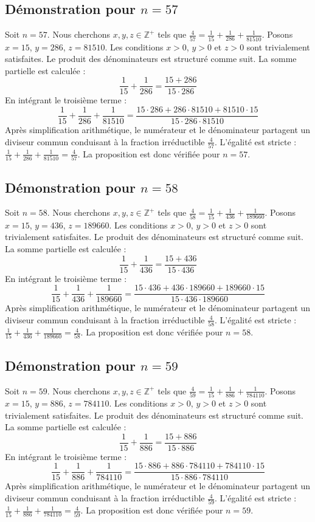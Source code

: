 \documentclass[11pt,a4paper]{article}
\begin{document}
\subsection{Démonstration pour $n = 57$}
Soit $n = 57$. Nous cherchons $x, y, z \in \mathbb{Z}^{+}$ tels que $\frac{4}{57} = \frac{1}{15} + \frac{1}{286} + \frac{1}{81510}$.
Posons $x = 15$, $y = 286$, $z = 81510$.
Les conditions $x > 0$, $y > 0$ et $z > 0$ sont trivialement satisfaites.
Le produit des dénominateurs est structuré comme suit. La somme partielle est calculée :
$$ \frac{1}{15} + \frac{1}{286} = \frac{15+286}{15 \cdot 286} $$
En intégrant le troisième terme :
$$ \frac{1}{15} + \frac{1}{286} + \frac{1}{81510} = \frac{15 \cdot 286 + 286 \cdot 81510 + 81510 \cdot 15}{15 \cdot 286 \cdot 81510} $$
Après simplification arithmétique, le numérateur et le dénominateur partagent un diviseur commun conduisant à la fraction irréductible $\frac{4}{57}$.
L'égalité est stricte : $\frac{1}{15} + \frac{1}{286} + \frac{1}{81510} = \frac{4}{57}$.
La proposition est donc vérifiée pour $n = 57$.
\subsection{Démonstration pour $n = 58$}
Soit $n = 58$. Nous cherchons $x, y, z \in \mathbb{Z}^{+}$ tels que $\frac{4}{58} = \frac{1}{15} + \frac{1}{436} + \frac{1}{189660}$.
Posons $x = 15$, $y = 436$, $z = 189660$.
Les conditions $x > 0$, $y > 0$ et $z > 0$ sont trivialement satisfaites.
Le produit des dénominateurs est structuré comme suit. La somme partielle est calculée :
$$ \frac{1}{15} + \frac{1}{436} = \frac{15+436}{15 \cdot 436} $$
En intégrant le troisième terme :
$$ \frac{1}{15} + \frac{1}{436} + \frac{1}{189660} = \frac{15 \cdot 436 + 436 \cdot 189660 + 189660 \cdot 15}{15 \cdot 436 \cdot 189660} $$
Après simplification arithmétique, le numérateur et le dénominateur partagent un diviseur commun conduisant à la fraction irréductible $\frac{4}{58}$.
L'égalité est stricte : $\frac{1}{15} + \frac{1}{436} + \frac{1}{189660} = \frac{4}{58}$.
La proposition est donc vérifiée pour $n = 58$.
\subsection{Démonstration pour $n = 59$}
Soit $n = 59$. Nous cherchons $x, y, z \in \mathbb{Z}^{+}$ tels que $\frac{4}{59} = \frac{1}{15} + \frac{1}{886} + \frac{1}{784110}$.
Posons $x = 15$, $y = 886$, $z = 784110$.
Les conditions $x > 0$, $y > 0$ et $z > 0$ sont trivialement satisfaites.
Le produit des dénominateurs est structuré comme suit. La somme partielle est calculée :
$$ \frac{1}{15} + \frac{1}{886} = \frac{15+886}{15 \cdot 886} $$
En intégrant le troisième terme :
$$ \frac{1}{15} + \frac{1}{886} + \frac{1}{784110} = \frac{15 \cdot 886 + 886 \cdot 784110 + 784110 \cdot 15}{15 \cdot 886 \cdot 784110} $$
Après simplification arithmétique, le numérateur et le dénominateur partagent un diviseur commun conduisant à la fraction irréductible $\frac{4}{59}$.
L'égalité est stricte : $\frac{1}{15} + \frac{1}{886} + \frac{1}{784110} = \frac{4}{59}$.
La proposition est donc vérifiée pour $n = 59$.
\end{document}
